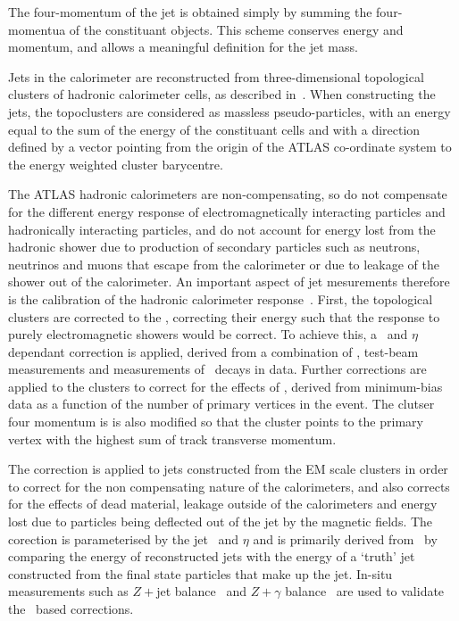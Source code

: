 The four-momentum of the jet is obtained simply by summing the four-momentua of
the constituant objects. This scheme conserves energy and momentum, and allows a
meaningful definition for the jet mass.

Jets in the calorimeter are reconstructed from three-dimensional topological clusters of hadronic
calorimeter cells, as described in~. When constructing the jets, the
topoclusters are considered as massless pseudo-particles, with an energy equal
to the sum of the energy of the constituant cells and with a direction defined
by a vector pointing from the origin of the ATLAS co-ordinate system to the energy weighted cluster barycentre.


The ATLAS hadronic calorimeters are non-compensating, so do not
compensate for the different energy response of electromagnetically interacting
particles and hadronically interacting particles, and do not account for energy 
lost from the hadronic shower due to production of
secondary particles such as neutrons, neutrinos and muons that escape from the calorimeter
or due to leakage of the shower out of the calorimeter. 
An important aspect of jet mesurements therefore is the calibration of the hadronic
calorimeter response~\cite{cat_thesis}. First, the topological clusters are corrected to the , correcting their energy such that the response to purely electromagnetic
showers
would be correct. To achieve this, a \pt\ and $\eta$ dependant correction is
applied, derived from a combination of \mcsim, test-beam measurements and
measurements of \Zee\ decays in data. Further corrections are applied to the
clusters to correct for the effects of \pu, derived from minimum-bias
data as a function of the number of primary vertices in the event. 
The clutser four momentum is is also modified so that the
cluster points to the primary vertex with the highest sum of track
transverse momentum. 

The  correction is
applied to jets constructed from the EM scale clusters in order to correct for the non compensating nature of the calorimeters, and also
corrects for the effects of dead material, leakage outside of the
calorimeters and energy lost due to particles being deflected out of the jet by
the magnetic fields. The corection is parameterised by
the jet \pt\ and $\eta$ and is primarily derived from \mcsim\ by comparing the
energy of reconstructed jets with the energy of a `truth' jet constructed from
the final state particles that make up the jet. In-situ measurements such as
$Z+$jet balance~\cite{ATLAS-CONF-2012-053} and $Z+\gamma$ balance~\cite{ATLAS-CONF-2012-063} are used to validate the \mc\ based corrections.



